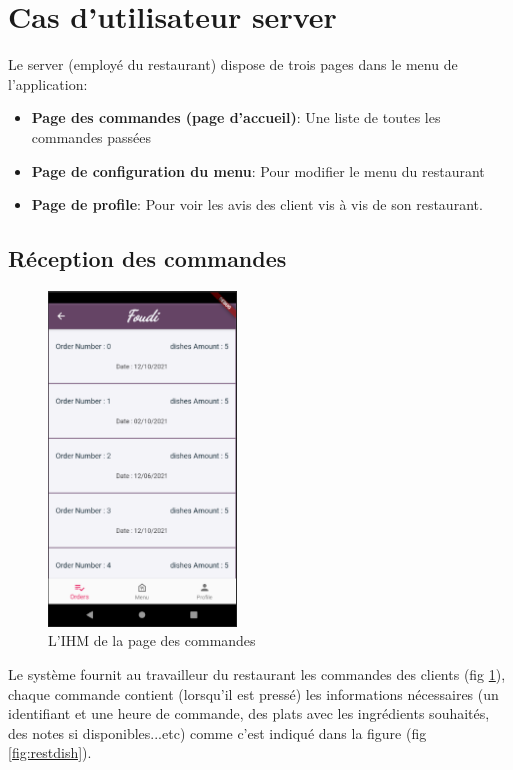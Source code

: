 \documentclass[french, a4paper, 12pt]{report}
\begin{document}
	\newpage
	\section{Cas d'utilisateur server} Le server (employé du restaurant) dispose de trois pages dans le menu de l'application:
		\begin{itemize}
			\item \textbf{Page des commandes (page d'accueil)}: Une liste de toutes les commandes passées
			\item \textbf{Page de configuration du menu}: Pour modifier le menu du restaurant
			\item \textbf{Page de profile}: Pour voir les avis des client vis à vis de son restaurant.
		\end{itemize}
		
		\subsection{Réception des commandes}
		
		\begin{figure}[h!]
			\center
			\includegraphics[width=5cm]{screenshots/Restaurantviews/ListofOrders(received).png}
			\caption{L'IHM de la page des commandes}
			\label{fig:restord}	
		\end{figure} Le système fournit au travailleur du restaurant les commandes des clients (fig \ref{fig:restord}), chaque commande contient (lorsqu'il est pressé) les informations nécessaires (un identifiant et une heure de commande, des plats avec les ingrédients souhaités, des notes si disponibles...etc) comme c'est indiqué dans  la figure (fig \ref{fig:restdish}).
		
\end{document}
